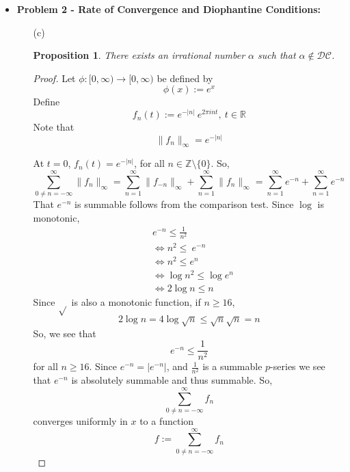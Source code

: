 \documentclass[12pt, reqno]{amsart}
\newtheorem{prop}{Proposition}[section]
\theoremstyle{definition}
\theoremstyle{remark}
\begin{document}
\begin{itemize}
\vspace{0.2 cm}

\item {\bf{Problem 2 - Rate of Convergence and Diophantine Conditions:}} 

\vspace{0.1 cm}
\begin{itemize}


\vspace{0.1 cm}
\item[(c)] %

\begin{prop}
    There exists an irrational number $\alpha$ such that $\alpha\notin\mathcal{DC}$.
\end{prop}

\begin{proof}
    
    Let $\phi:[0,\infty)\rightarrow [0,\infty)$ be defined by $$\phi(x):=e^{x}$$
    Define $$f_{n}(t):=e^{-|n|}~e^{2\pi int},~t\in \mathbb{R}$$
    Note that
    $$\|f_{n}\|_{\infty}=e^{-|n|}$$
    
    
    At $t=0$, $f_{n}(t)=e^{-|n|}$, for all $n\in\mathbb{Z}\setminus\{0\}$. So, $$\sum_{0\ne n=-\infty}^{\infty} \|f_{n}\|_{\infty}=\sum_{n=1}^{\infty}\|f_{-n}\|_{\infty}+\sum_{n=1}^{\infty}\|f_{n}\|_{\infty}=\sum_{n=1}^{\infty}e^{-n}+\sum_{n=1}^{\infty}e^{-n}$$
    That $e^{-n}$ is summable follows from the comparison test. Since $\log$ is monotonic, 
    \begin{align*}
    &e^{-n}\le \frac{1}{n^{2}}\\
    &\iff n^{2}\le~e^{-n}\\
    &\iff n^{2}\le e^{n}\\
    &\iff \log n^{2}\le \log e^{n}\\
    &\iff 2\log n\le n
    \end{align*}
    Since $\sqrt{}$ is also a monotonic function, if $n\ge16$, $$2\log n=4\log \sqrt{n}\le \sqrt{n}\sqrt{n}=n$$
    So, we see that $$e^{-n}\le \frac{1}{n^{2}}$$for all $n\ge 16$. Since $e^{-n}=|e^{-n}|$, and $\frac{1}{n^{2}}$ is a summable $p$-series we see that $e^{-n}$ is absolutely summable and thus summable. So, $$\sum_{0\ne n=-\infty}^{\infty}f_{n}$$converges uniformly in $x$ to a function $$f:=\sum_{0\ne n=-\infty}^{\infty}f_{n}$$
    

\end{proof}
\end{itemize}
\end{itemize}
\end{document}
